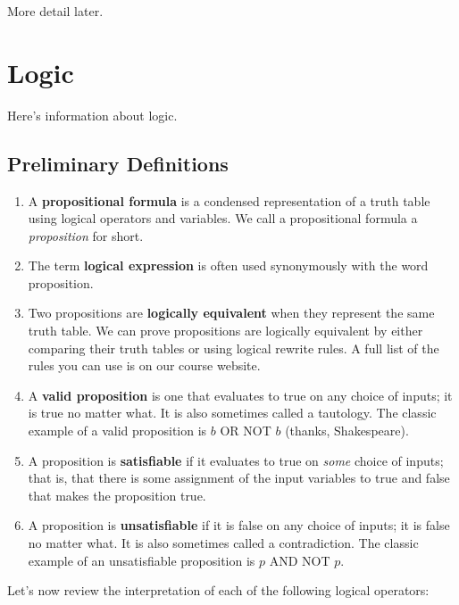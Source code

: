 \documentclass[12pt,letterpaper]{article}
\begin{document}
    More detail later.


\section{Logic}

Here's information about logic.

    \subsection{Preliminary Definitions}
    
    \begin{enumerate}
      
    \item A \textbf{propositional formula} is a condensed representation of a truth table using logical operators and variables. We call a propositional formula a \textit{proposition} for short. 
    
    \item The term \textbf{logical expression} is often used synonymously with the word proposition. 
    
    \item Two propositions are \textbf{logically equivalent} when they represent the same truth table. We can prove propositions are logically equivalent by either comparing their truth tables or using logical rewrite rules. A full list of the rules you can use is on our course website.
    
    \item A \textbf{valid proposition} is one that evaluates to true on any choice of inputs; it is true no matter what. It is also sometimes called a tautology. The classic example of a valid proposition is $b$ OR NOT $b$ (thanks, Shakespeare). 
    
    \item A proposition is \textbf{satisfiable} if it evaluates to true on \textit{some} choice of inputs; that is, that there is some assignment of the input variables to true and false that makes the proposition true.
    
    \item A proposition is \textbf{unsatisfiable} if it is false on any choice of inputs; it is false no matter what. It is also sometimes called a contradiction. The classic example of an unsatisfiable proposition is $p$ AND NOT $p$. 
\end{enumerate}

Let's now review the interpretation of each of the following logical operators:    
\end{document}
